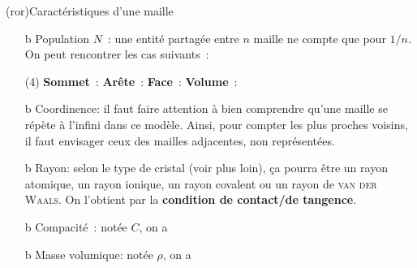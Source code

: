 \documentclass[../../main/main.tex]{subfiles}
\begin{document}
\begin{tcb*}(ror){Caractéristiques d'une maille}
	\begin{itemize}
		\item[b]{Population} $N$~: une entité partagée entre $n$ maille ne compte que
		pour $1/n$. On peut rencontrer les cas suivants~:
		\begin{tasks}[label=\bdmd](4)
			\task\textbf{Sommet}~: 
			\task\textbf{Arête}~: 
			\task\textbf{Face}~: 
			\task\textbf{Volume}~: 
		\end{tasks}
		\item[b]{Coordinence}: il faut faire attention à bien comprendre qu'une maille
		se répète à l'infini dans ce modèle. Ainsi, pour compter les plus proches
		voisins, il faut envisager ceux des mailles adjacentes, non représentées.
		\item[b]{Rayon}: selon le type de cristal (voir plus loin), ça pourra être un
		rayon atomique, un rayon ionique, un rayon covalent ou un rayon de
		\textsc{van der Waals}. On l'obtient par la \textbf{condition de contact/de
			tangence}.
		\item[b]{Compacité}~: notée $C$, on a
		\psw{%
			\[
				\boxed{
					C =
					\frac{\text{volume \textbf{des} motifs}}{\text{volume d'une maille}} =
					\frac{N \times V\ind{motif}}{V\ind{maille}}
					<
					1
				}
			\]
		}%
		\vspace{-15pt}
		\item[b]{Masse volumique}: notée $\rho$, on a
		\psw{%
			\[
				\boxed{
					\rho =
					\frac{\text{masse \textbf{des} motifs}}{\text{volume d'une maille}} =
					\frac{N \times m\ind{motif}}{V\ind{maille}} =
					\frac{NM\ind{motif}}{\Nc_AV\ind{maille}}
				}
			\]
		}%
		\vspace{-15pt}
	\end{itemize}
\end{tcb*}
\end{document}
